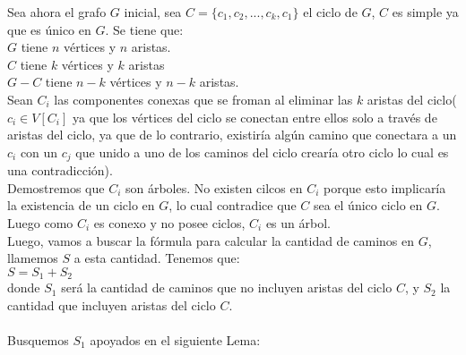 \documentclass[12pt]{article}
\begin{document}
Sea ahora el grafo $G$ inicial, sea $C=\{c_1,c_2,...,c_k,c_1\}$ el ciclo de $G$, $C$ es simple ya que es \'unico en $G$.
Se tiene que:\\
$G$ tiene $n$ v\'ertices y $n$ aristas.\\
$C$ tiene $k$ v\'ertices y $k$ aristas\\
$G-C$ tiene $n-k$ v\'ertices y $n-k$ aristas.\\
Sean $C_i$ las componentes conexas que se froman al eliminar las $k$ aristas del ciclo($c_i\in V[C_i]$ ya que los v\'ertices del 
ciclo se conectan entre ellos solo a trav\'es de aristas del ciclo, ya que de lo contrario, existir\'ia alg\'un camino que conectara a un 
$c_i$ con un $c_j$ que unido a uno de los caminos del ciclo crear\'ia otro ciclo lo cual es una contradicci\'on).\\ 
Demostremos que $C_i$ son \'arboles. No existen 
cilcos en $C_i$ porque esto implicar\'ia la existencia de un ciclo en $G$, lo cual contradice que $C$ sea el \'unico ciclo en $G$. Luego como 
$C_i$ es conexo y no posee ciclos, $C_i$ es un \'arbol.\\

Luego, vamos a buscar la f\'ormula para calcular la cantidad de caminos en $G$, llamemos $S$ a esta cantidad. Tenemos que:\\
$S = S_1 + S_2$\\
donde $S_1$ ser\'a la cantidad de caminos que no incluyen aristas del ciclo $C$, y $S_2$ la cantidad que incluyen aristas del 
ciclo $C$.\\
\\

Busquemos $S_1$ apoyados en el siguiente Lema:\\
\end{document}

